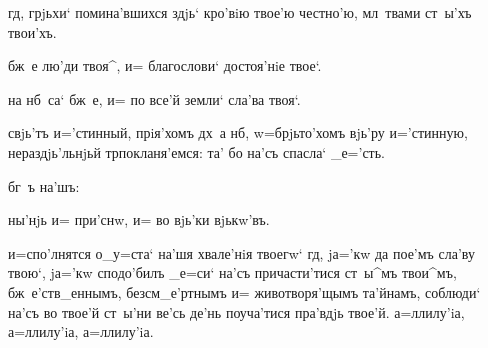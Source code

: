  гд, грjьхи` помина'вшихся здjь` кро'вiю 
твое'ю честно'ю, мл~твами ст~ы'хъ твои'хъ.



 бж~е лю'ди твоя^, и= благослови` достоя'нiе 
твое`.


 на нб~са` бж~е, и= по все'й земли` сла'ва 
твоя`.


 свjь'тъ и='стинный, прiя'хомъ дх~а 
нб, w=брjьто'хомъ вjь'ру и='стинную, 
нераздjь'льнjьй тр покланя'емся: та' бо на'съ 
спасла` _е='сть.

                                            бг~ъ на'шъ:


 ны'нjь и= при'снw, и= во вjь'ки вjькw'въ.


 и=спо'лнятся о_у=ста` на'шя хвале'нiя твоегw` 
гд, jа='кw да пое'мъ сла'ву твою`, jа='кw сподо'билъ 
_е=си` на'съ причасти'тися ст~ы^мъ твои^мъ, 
бж~е'ств_еннымъ, безсм_е'ртнымъ и= животворя'щымъ 
та'йнамъ, соблюди` на'съ во твое'й ст~ы'ни ве'сь де'нь 
поуча'тися пра'вдjь твое'й. а=ллилу'iа, а=ллилу'iа, 
а=ллилу'iа.

